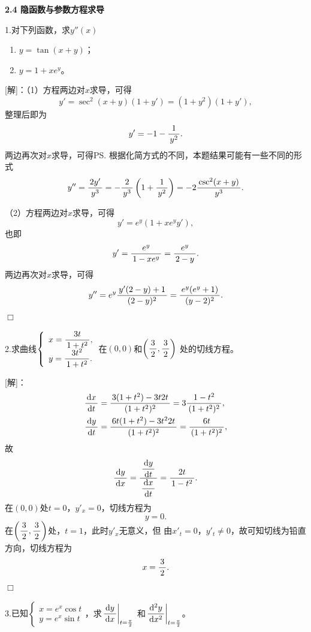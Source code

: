 \begin{center}
	\bf 2.4 隐函数与参数方程求导
\end{center}

\bigskip

1.对下列函数，求$y''(x)$
  \begin{enumerate}[(1)]
    \setlength{\itemindent}{1cm}
    \item $y=\tan(x+y)$；
    \item $y=1+xe^y$。
  \end{enumerate}

[解]：（1）方程两边对$x$求导，可得
$$y'=\sec^2(x+y)(1+y')=(1+y^2)(1+y'),$$
整理后即为
$$y'=-1-\df1{y^2}.$$
两边再次对$x$求导，可得\ps{根据化简方式的不同，本题结果可能有一些不同的形式}
$$y''=\df{2y'}{y^3}=-\df2{y^3}\left(1+\df1{y^2}\right)
=-2\df{\csc^2(x+y)}{y^3}.$$

（2）方程两边对$x$求导，可得
$$y'=e^y(1+xe^yy'),$$
也即
$$y'=\df{e^y}{1-xe^y}=\df{e^y}{2-y}.$$
两边再次对$x$求导，可得
$$y''=e^y\df{y'(2-y)+1}{(2-y)^2}=\df{e^y(e^y+1)}{(y-2)^2}.$$
\hfill$\Box$

\bigskip

2.求曲线$\left\{\begin{array}{l}
x=\df{3t}{1+t^2},\\ y=\df{3t^2}{1+t^2}.
\end{array}\right.$在$(0,0)$和$\left(\df32,\df32\right)$
处的切线方程。

[解]：
\begin{align*}
	\df{\d x}{\d t}&=\df{3(1+t^2)-3t2t}{(1+t^2)^2}=3\df{1-t^2}{(1+t^2)^2},\\
	\df{\d y}{\d t}&=\df{6t(1+t^2)-3t^22t}{(1+t^2)^2}
	=\df{6t}{(1+t^2)^2},
\end{align*}
故
$$\df{\d y}{\d x}=\df{\df{\d y}{\d t}}{\df{\d x}{\d t}}
=\df{2t}{1-t^2}.$$
在$(0,0)$处$t=0$，$y'_x=0$，切线方程为
$$y=0.$$
在$\left(\df32,\df32\right)$处，$t=1$，此时$y'_x$无意义，但
由$x'_t=0$，$y'_t\ne 0$，故可知切线为铅直方向，切线方程为
$$x=\df32.$$
\hfill$\Box$

\bigskip

3.已知$\left\{\begin{array}{l}
  	x=e^x\cos t\\ y=e^x\sin t
\end{array}\right.$，求$\left.\df{\d y}{\d x}\right|_{t=\frac{\pi}2}$
和$\left.\df{\d^2 y}{\d x^2}\right|_{t=\frac{\pi}2}$。

